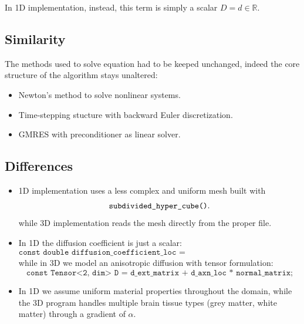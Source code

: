 \documentclass[12pt, a4paper, twoside, openright]{report}
\begin{document}
 In 1D implementation, instead, this term is simply a scalar $D=d \in \mathbb{R}$.
 \subsection{Similarity}
 The methods used to solve equation had to be keeped unchanged, indeed the core structure of the algorithm stays unaltered:
 \begin{itemize}
     \item Newton's method to solve nonlinear systems.
     \item Time-stepping stucture with backward Euler discretization.
     \item GMRES with preconditioner as linear solver.
 \end{itemize}
 \subsection{Differences}
 \begin{itemize}
  \item 1D implementation uses a less complex and uniform mesh built with 
        \[
        \verb|subdivided_hyper_cube()|.
        \]
        while 3D implementation reads the mesh directly from the proper file.
        
  \item In 1D the diffusion coefficient is just a scalar:
        \[
          \texttt{const double diffusion\_coefficient\_loc = diffusion\_coefficient.value();}
        \]
        while in 3D we model an anisotropic diffusion with tensor formulation:
        \[
          \texttt{const Tensor<2, dim> D = d\_ext\_matrix + d\_axn\_loc * normal\_matrix;}
        \]
        
  \item In 1D we assume uniform material properties throughout the domain, while the 3D program handles multiple brain tissue types (grey matter, white matter) through a gradient of $\alpha$.
\end{itemize}
\end{document}
